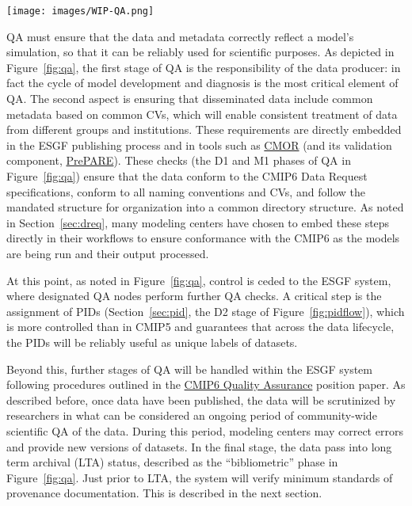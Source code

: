 \documentclass[gmd,manuscript]{copernicus}
\newcommand{\figref}[1] {\mbox{Figure   \ref{fig:#1}}}
\newcommand{\secref}[1] {\mbox{Section  \ref{sec:#1}}}
\begin{document}
\begin{figure*}
  \begin{center}
    \texttt{[image: images/WIP-QA.png]}
  \end{center}
  \caption{Schematic of the phases of quality assurance, with earlier
    stages in the hands of modeling centers (left), and more formal
    long-term data curation stages at right. Quality assurance is
    applied both to the data (D, above) as well as the metadata (M)
    describing the data. Figure drawn from the WIP's Quality Assurance
    position paper.}
  \label{fig:qa}
\end{figure*}

QA must ensure that the data and metadata correctly reflect a model's
simulation, so that it can be reliably used for scientific purposes.
As depicted in \figref{qa}, the first stage of QA is the
responsibility of the data producer: in fact the cycle of model
development and diagnosis is the most critical element of QA. The
second aspect is ensuring that disseminated data include common
metadata based on common CVs, which will enable consistent treatment
of data from different groups and institutions. These requirements are
directly embedded in the ESGF publishing process and in tools such as
\href{https://cmor.llnl.gov/}{CMOR} (and its validation component,
\href{https://goo.gl/ApvMJx}{PrePARE}). These checks (the D1 and
M1 phases of QA in \figref{qa}) ensure that the data conform to the
CMIP6 Data Request specifications, conform to all naming conventions
and CVs, and follow the mandated structure for organization into a
common directory structure. As noted in \secref{dreq}, many modeling
centers have chosen to embed these steps directly in their workflows
to ensure conformance with the CMIP6 as the models are being run and
their output processed.

At this point, as noted in \figref{qa}, control is ceded to the ESGF
system, where designated QA nodes perform further QA checks. A
critical step is the assignment of PIDs (\secref{pid}, the D2 stage of
\figref{pidflow}), which is more controlled than in CMIP5 and
guarantees that across the data lifecycle, the PIDs will be reliably
useful as unique labels of datasets.

Beyond this, further stages of QA will be handled within the ESGF
system following procedures outlined in the
\href{https://goo.gl/eEr8bS}{CMIP6 Quality Assurance} position paper.
As described before, once data have been published, the data will be
scrutinized by researchers in what can be considered an ongoing period
of community-wide scientific QA of the data. During this period,
modeling centers may correct errors and provide new versions of
datasets. In the final stage, the data pass into long term archival
(LTA) status, described as the ``bibliometric'' phase in \figref{qa}.
Just prior to LTA, the system will verify minimum standards of
provenance documentation. This is described in the next section.
\end{document}
